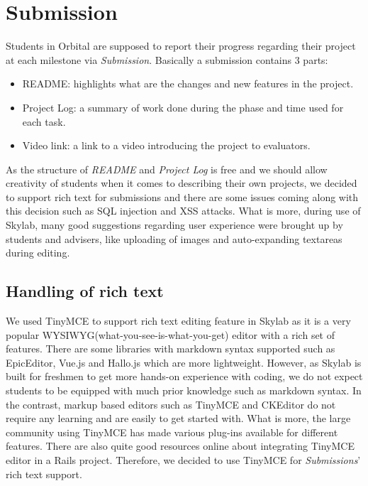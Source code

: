 \section{Submission} \label{submission}

Students in Orbital are supposed to report their progress regarding their project at each milestone via \textit{Submission}. Basically a submission contains 3 parts:

\begin{itemize}
  \item README: highlights what are the changes and new features in the project.
  \item Project Log: a summary of work done during the phase and time used for each task.
  \item Video link: a link to a video introducing the project to evaluators.
\end{itemize}

As the structure of \textit{README} and \textit{Project Log} is free and we should allow creativity of students when it comes to describing their own projects, we decided to support rich text for submissions and there are some issues coming along with this decision such as SQL injection and XSS attacks. What is more, during use of Skylab, many good suggestions regarding user experience were brought up by students and advisers, like uploading of images and auto-expanding textareas during editing.

\subsection{Handling of rich text}

We used TinyMCE to support rich text editing feature in Skylab as it is a very popular WYSIWYG(what-you-see-is-what-you-get) editor with a rich set of features\cite{citationtinymce}. There are some libraries with markdown syntax supported such as EpicEditor, Vue.js and Hallo.js which are more lightweight. However, as Skylab is built for freshmen to get more hands-on experience with coding, we do not expect students to be equipped with much prior knowledge such as markdown syntax. In the contrast, markup based editors such as TinyMCE and CKEditor do not require any learning and are easily to get started with. What is more, the large community using TinyMCE has made various plug-ins available for different features. There are also quite good resources online about integrating TinyMCE editor in a Rails project. Therefore, we decided to use TinyMCE for \textit{Submissions}' rich text support.

